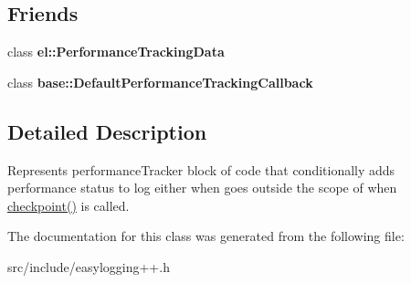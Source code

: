 \subsection*{Friends}
\begin{DoxyCompactItemize}
\item 
\mbox{\label{classel_1_1base_1_1_performance_tracker_a7a4da7334b79856c37538484584207a6}} 
class {\bfseries el\+::\+Performance\+Tracking\+Data}
\item 
\mbox{\label{classel_1_1base_1_1_performance_tracker_ad346c4097e3db22a7434e7da5aa9c5e3}} 
class {\bfseries base\+::\+Default\+Performance\+Tracking\+Callback}
\end{DoxyCompactItemize}


\subsection{Detailed Description}
Represents performance\+Tracker block of code that conditionally adds performance status to log either when goes outside the scope of when \hyperlink{classel_1_1base_1_1_performance_tracker_aec9a6e149674c5782cc855e49aeb0aaf}{checkpoint()} is called. 

The documentation for this class was generated from the following file\+:\begin{DoxyCompactItemize}
\item 
src/include/easylogging++.\+h\end{DoxyCompactItemize}
